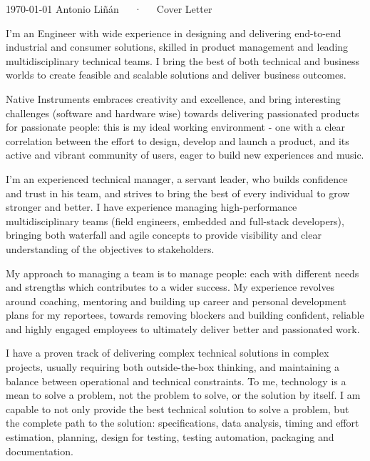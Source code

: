 \documentclass[11pt, a4paper]{awesome-cv}
\begin{document}
\makecvheader[R]

\makecvfooter
  {\today}
  {Antonio Liñán~~~·~~~Cover Letter}
  {}


\begin{cvletter}

I'm an Engineer with wide experience in designing and delivering end-to-end industrial and consumer solutions, skilled in product management and leading multidisciplinary technical teams.  I bring the best of both technical and business worlds to create feasible and scalable solutions and deliver business outcomes.

Native Instruments embraces creativity and excellence, and bring interesting challenges (software and hardware wise) towards delivering passionated products for passionate people: this is my ideal working environment - one with a clear correlation between the effort to design, develop and launch a product, and its active and vibrant community of users, eager to build new experiences and music.

I'm an experienced technical manager, a servant leader, who builds confidence and trust in his team, and strives to bring the best of every individual to grow stronger and better.  I have experience managing high-performance multidisciplinary teams (field engineers, embedded and full-stack developers), bringing both waterfall and agile concepts to provide visibility and clear understanding of the objectives to stakeholders.

My approach to managing a team is to manage people: each with different needs and strengths which contributes to a wider success.  My experience revolves around coaching, mentoring and building up career and personal development plans for my reportees, towards removing blockers and building confident, reliable and highly engaged employees to ultimately deliver better and passionated work.

I have a proven track of delivering complex technical solutions in complex projects, usually requiring both outside-the-box thinking, and maintaining a balance between operational and technical constraints.  To me, technology is a mean to solve a problem, not the problem to solve, or the solution by itself.  I am capable to not only provide the best technical solution to solve a problem, but the complete path to the solution: specifications, data analysis, timing and effort estimation, planning, design for testing, testing automation, packaging and documentation.

\end{cvletter}


\makeletterclosing
\end{document}
